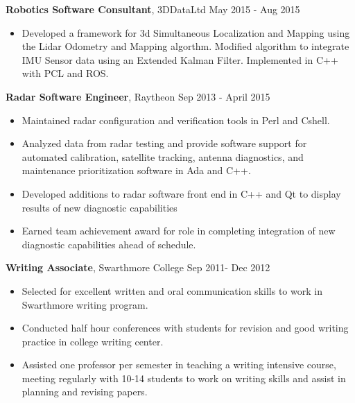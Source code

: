 \documentclass{article} %
\newcommand{\rjob}[2]{
\vspace{0.1cm}
\hspace*{-0.3cm}  
{\fontsize{10pt}{12pt}\selectfont #1} \hfill #2 
\vspace*{0.1cm} 
\hspace*{-1.2cm}
}
\newenvironment{ritemize}{
\hspace*{-0.8cm} 
\begin{minipage}{1.05\linewidth}
\begin{itemize}
}{
\end{itemize}
\end{minipage}
\vspace{-0.2cm}
}
\newcommand{\ritem}{
\item[-]
}
\begin{document}
\rjob{\textbf{Robotics Software Consultant}, 3DDataLtd}{May 2015 - Aug 2015}\\
\begin{ritemize}
\ritem Developed a framework for 3d Simultaneous Localization and Mapping using the Lidar Odometry and Mapping algorthm. Modified algorithm to integrate IMU Sensor data using an Extended Kalman Filter. Implemented in C++ with PCL and ROS.
\end{ritemize}

\rjob{\textbf{Radar Software Engineer}, Raytheon}{Sep 2013 - April 2015}\\
\begin{ritemize}
\ritem Maintained radar configuration and verification tools in Perl and Cshell.
\ritem Analyzed data from radar testing and provide software support for automated calibration, satellite tracking, antenna diagnostics, and maintenance prioritization software in Ada and C++.
\ritem Developed additions to radar software front end in C++ and Qt to display results of new diagnostic capabilities
\ritem Earned team achievement award for role in completing integration of new diagnostic capabilities ahead of schedule.
\end{ritemize}






\rjob{\textbf{Writing Associate}, Swarthmore College}{Sep 2011- Dec 2012}\\
\begin{ritemize}
\ritem Selected for excellent written and oral communication skills to work in Swarthmore writing program.
\ritem Conducted half hour conferences with students for revision and good writing practice in college writing center.
\ritem Assisted one professor per semester in teaching a writing intensive course, meeting regularly with 10-14 students to work on writing skills and assist in planning and revising papers.
\end{ritemize}


\end{document}
